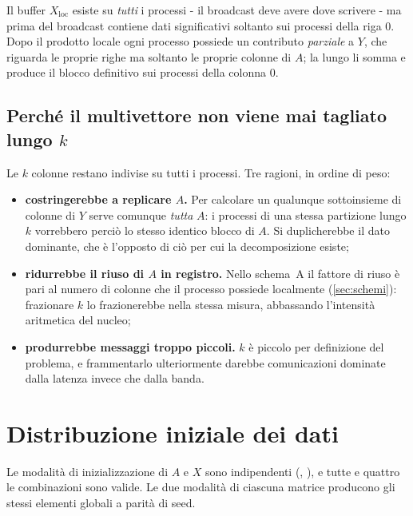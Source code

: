 Il buffer $X_{\text{loc}}$ esiste su \emph{tutti} i processi - il broadcast
deve avere dove scrivere - ma prima del broadcast contiene dati significativi
soltanto sui processi della riga $0$. Dopo il prodotto locale ogni processo
possiede un contributo \emph{parziale} a $Y$, che riguarda le proprie righe ma
soltanto le proprie colonne di $A$; la  lungo
 li somma e produce il blocco definitivo sui processi della
colonna $0$.

\subsection{Perché il multivettore non viene mai tagliato lungo \texorpdfstring{$k$}{k}}

Le $k$ colonne restano indivise su tutti i processi. Tre ragioni, in ordine di
peso:

\begin{itemize}[nosep,left=0pt]
  \item \textbf{costringerebbe a replicare $A$.} Per calcolare un qualunque
        sottoinsieme di colonne di $Y$ serve comunque \emph{tutta} $A$: i
        processi di una stessa partizione lungo $k$ vorrebbero perciò lo stesso
        identico blocco di $A$. Si duplicherebbe il dato dominante, che è l'opposto di ciò per cui la decomposizione
        esiste;
  \item \textbf{ridurrebbe il riuso di $A$ in registro.} Nello schema~A il
        fattore di riuso è pari al numero di colonne che il processo possiede
        localmente (\cref{sec:schemi}): frazionare $k$ lo frazionerebbe nella
        stessa misura, abbassando l'intensità aritmetica del nucleo;
  \item \textbf{produrrebbe messaggi troppo piccoli.} $k$ è piccolo per
        definizione del problema, e frammentarlo ulteriormente darebbe
        comunicazioni dominate dalla latenza invece che dalla banda.
\end{itemize}

\section{Distribuzione iniziale dei dati}
\label{sec:distribuzione-a}

Le modalit\`a di inizializzazione di $A$ e $X$ sono indipendenti
(, ), e tutte e quattro le combinazioni sono
valide. Le due modalità di ciascuna matrice producono gli stessi elementi
globali a parità di seed.

